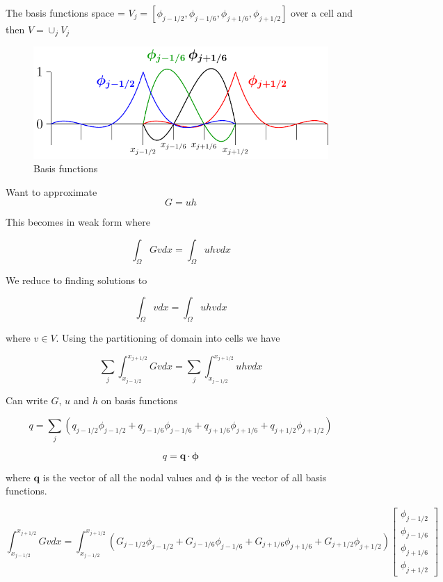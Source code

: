 \documentclass{article}
\newcommand{\vecn}[1]{\boldsymbol{#1}}
\begin{document}
The basis functions space = $V_j = \left[\phi_{j-1/2},\phi_{j-1/6},\phi_{j+1/6},\phi_{j+1/2}\right]$ over a cell and then $V = \cup_j V_j$
\begin{figure}
\centering
\includegraphics{P3.pdf}
\caption{Basis functions}
\end{figure}

Want to approximate 
\begin{equation}
G = uh
\end{equation}

This becomes in weak form where

\begin{equation}
\int_\Omega G v dx = \int_\Omega uh v dx
\end{equation}

We reduce to finding solutions to 

\begin{equation}
\int_\Omega v dx = \int_\Omega uh v dx
\end{equation}

where $v \in V$. Using the partitioning of domain into cells we have

\begin{equation}
 \sum_j \int_{x_{j-1/2}}^{x_{j+1/2}} G v dx = \sum_j \int_{x_{j-1/2}}^{x_{j+1/2}} uh v dx
\end{equation}

Can write $G$, $u$ and $h$ on basis functions

$$q = \sum_j \left(q_{j-1/2}\phi_{j-1/2} + q_{j-1/6}\phi_{j-1/6} + q_{j+1/6}\phi_{j+1/6}  +q_{j+1/2}\phi_{j+1/2}\right)$$

$$q = \vecn{q} \cdot \vecn{\phi}$$

where $\vecn{q}$ is the vector of all the nodal values and $\vecn{\phi}$ is the vector of all basis functions. 

\begin{equation}
\int_{x_{j-1/2}}^{x_{j+1/2}} G v dx = \int_{x_{j-1/2}}^{x_{j+1/2}} \left(G_{j-1/2}\phi_{j-1/2} + G_{j-1/6}\phi_{j-1/6} + G_{j+1/6}\phi_{j+1/6}  + G_{j+1/2}\phi_{j+1/2}\right) \begin{bmatrix}
\phi_{j-1/2} \\ \phi_{j-1/6}\\ \phi_{j+1/6} \\\phi_{j+1/2}
\end{bmatrix} 
\end{equation}
\end{document}
